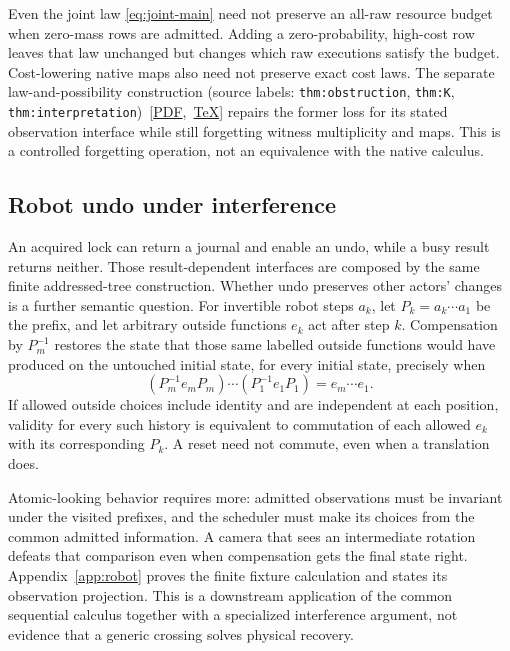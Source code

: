 \documentclass[11pt]{article}
\numberwithin{equation}{section}
\theoremstyle{definition}\newtheorem{definition}[theorem]{Definition}
\begin{document}
Even the joint law \eqref{eq:joint-main} need not preserve an all-raw
resource budget when zero-mass rows are admitted. Adding a zero-probability,
high-cost row leaves that law unchanged but changes which raw executions
satisfy the budget. Cost-lowering native maps also need not preserve exact
cost laws. The separate
law-and-possibility construction (source labels: \texttt{thm:obstruction}, \texttt{thm:K}, \texttt{thm:interpretation})~\mbox{[\href{https://github.com/eternal-november/eos-research-programmes/blob/10e771644cfdf58c3d05e989e4b26cae7164c80a/projects/contextual-composition/protocols/law-and-possibility/Law_and_Possibility_Repair_for_Dependent_Protocols.pdf}{PDF}, \href{https://github.com/eternal-november/eos-research-programmes/blob/10e771644cfdf58c3d05e989e4b26cae7164c80a/projects/contextual-composition/protocols/law-and-possibility/Law_and_Possibility_Repair_for_Dependent_Protocols.tex}{TeX}]}
repairs the former loss for its stated observation interface while still
forgetting witness multiplicity and maps. This is a controlled forgetting
operation, not an equivalence with the native calculus.

\subsection{Robot undo under interference}
An acquired lock can return a journal and enable an undo, while a busy
result returns neither. Those result-dependent interfaces are composed by
the same finite addressed-tree construction. Whether undo preserves other
actors' changes is a further semantic question. For invertible robot steps
$a_k$, let $P_k=a_k\cdots a_1$ be the prefix, and let arbitrary outside
functions $e_k$ act after step $k$. Compensation by $P_m^{-1}$ restores the
state that those same labelled outside functions would have produced on the
untouched initial state, for every initial state, precisely when
\begin{equation}\label{eq:robot-main}
 (P_m^{-1}e_mP_m)\cdots(P_1^{-1}e_1P_1)=e_m\cdots e_1.
\end{equation}
If allowed outside choices include identity and are independent at each
position, validity for every such history is equivalent to commutation of
each allowed $e_k$ with its corresponding $P_k$. A reset need not commute,
even when a translation does.

Atomic-looking behavior requires more: admitted observations must be
invariant under the visited prefixes, and the scheduler must make its choices
from the common admitted information. A camera that sees an intermediate
rotation defeats that comparison even when compensation gets the final
state right. Appendix~\ref{app:robot} proves the finite fixture calculation
and states its observation projection. This is a downstream application of
the common sequential calculus together with a specialized interference
argument, not evidence that a generic crossing solves physical recovery.
\end{document}
